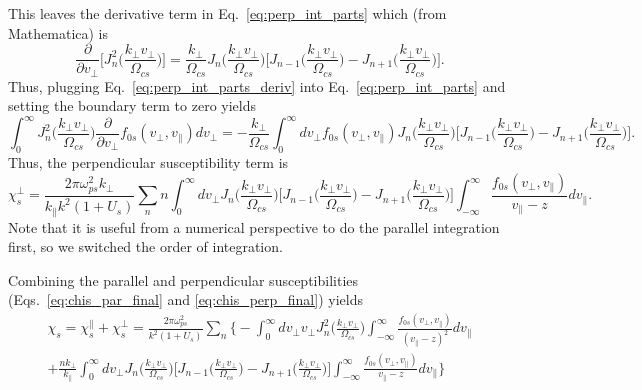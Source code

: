 This leaves the derivative term in Eq.~\ref{eq:perp_int_parts} which (from Mathematica) is
\begin{equation}
	\frac{\partial}{\partial v_\perp} \Bigg[  
	J_n^2 \bigg( \frac{k_\perp v_\perp}{\Omega_{cs}}  \bigg) \Bigg]= 
	\frac{k_\perp}{\Omega_{cs}} J_n \bigg( \frac{k_\perp v_\perp}{\Omega_{cs}}  \bigg)
	\Bigg[ 
	J_{n-1} \bigg( \frac{k_\perp v_\perp}{\Omega_{cs}}  \bigg)
	-J_{n+1} \bigg( \frac{k_\perp v_\perp}{\Omega_{cs}}  \bigg)
	\Bigg].
	\label{eq:perp_int_parts_deriv}
\end{equation} 
Thus, plugging Eq.~\ref{eq:perp_int_parts_deriv} into Eq.~\ref{eq:perp_int_parts} and setting the boundary term to zero yields
\begin{equation}
	\int_0^\infty J_n^2 \bigg( \frac{k_\perp v_\perp}{\Omega_{cs}}  \bigg)
	\frac{\partial }{\partial v_\perp} f_{0s}(v_\perp, v_\parallel) dv_\perp = 
	-\frac{k_\perp}{\Omega_{cs}} 
	\int_0^\infty dv_\perp f_{0s}(v_\perp, v_\parallel)
	J_n \bigg( \frac{k_\perp v_\perp}{\Omega_{cs}}  \bigg)
	\Bigg[ 
	J_{n-1} \bigg( \frac{k_\perp v_\perp}{\Omega_{cs}}  \bigg)
	-J_{n+1} \bigg( \frac{k_\perp v_\perp}{\Omega_{cs}}  \bigg)
	\Bigg].
	\label{eq:perp_int_parts_final}
\end{equation}
Thus, the perpendicular susceptibility term is
\begin{equation}
	\chi_s^\perp = \frac{2\pi \omega_{ps}^2 k_\perp}{k_\parallel k^2 (1+U_s)} \sum_n
	n 
	\int_{0}^\infty dv_\perp J_n \bigg( \frac{k_\perp v_\perp}{\Omega_{cs}}  \bigg)
	\Bigg[ 
	J_{n-1} \bigg( \frac{k_\perp v_\perp}{\Omega_{cs}}  \bigg)
	-J_{n+1} \bigg( \frac{k_\perp v_\perp}{\Omega_{cs}}  \bigg)
	\Bigg]
	\int_{-\infty}^\infty \frac{f_{0s}(v_\perp, v_\parallel)}{v_\parallel-z} dv_\parallel.
	\label{eq:chis_perp_final}
\end{equation}
Note that it is useful from a numerical perspective to do the parallel integration first,
so we switched the order of integration.

Combining the parallel and perpendicular susceptibilities (Eqs.~\ref{eq:chis_par_final} and \ref{eq:chis_perp_final}) yields
\begin{multline}
	\chi_s = \chi_s^\parallel + \chi_s^\perp = 
	\frac{2\pi \omega_{ps}^2}{k^2 (1+U_s)}	\sum_n
	\Bigg\{ - \int_0^\infty dv_\perp v_\perp J_n^2 \bigg( \frac{k_\perp v_\perp}{\Omega_{cs}}  \bigg) 
	\int_{-\infty}^\infty \frac{f_{0s}(v_\perp, v_\parallel)}{(v_\parallel-z)^2} dv_\parallel \\
	+ \frac{nk_\perp}{k_\parallel} \int_0^\infty dv_\perp J_n \bigg( \frac{k_\perp v_\perp}{\Omega_{cs}}  \bigg)
	\Bigg[ 
	J_{n-1} \bigg( \frac{k_\perp v_\perp}{\Omega_{cs}}  \bigg)
	-J_{n+1} \bigg( \frac{k_\perp v_\perp}{\Omega_{cs}}  \bigg)
	\Bigg]
	\int_{-\infty}^\infty \frac{f_{0s}(v_\perp, v_\parallel)}{v_\parallel-z} dv_\parallel
	\Bigg\}
	\label{eq:chis_final}
\end{multline}

